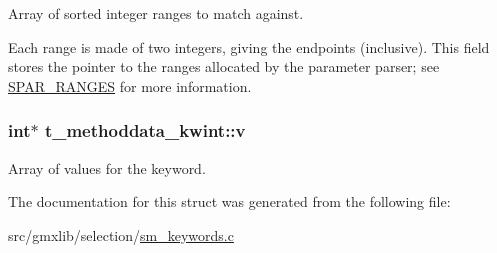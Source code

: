 \-Array of sorted integer ranges to match against. 

\-Each range is made of two integers, giving the endpoints (inclusive). \-This field stores the pointer to the ranges allocated by the parameter parser; see \hyperlink{share_2template_2gromacs_2selparam_8h_ab39fef32ca729815df1299fafdd623b1}{\-S\-P\-A\-R\-\_\-\-R\-A\-N\-G\-E\-S} for more information. \hypertarget{structt__methoddata__kwint_a3da96c2bfd6a3309985ee374a7d7fa64}{
\subsubsection[{v}]{\setlength{\rightskip}{0pt plus 5cm}int$\ast$ {\bf t\-\_\-methoddata\-\_\-kwint\-::v}}}\label{structt__methoddata__kwint_a3da96c2bfd6a3309985ee374a7d7fa64}
\-Array of values for the keyword. 

\-The documentation for this struct was generated from the following file\-:\begin{DoxyCompactItemize}
\item 
src/gmxlib/selection/\hyperlink{sm__keywords_8c}{sm\-\_\-keywords.\-c}\end{DoxyCompactItemize}
